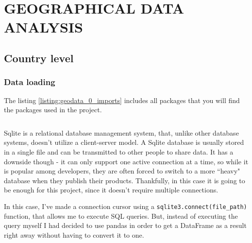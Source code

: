 \documentclass[12pt, a4paper]{article}
\begin{document}
\newpage
\section{GEOGRAPHICAL DATA ANALYSIS}

\subsection{Country level}
\subsubsection{Data loading}


The listing \ref{listing:geodata_0_imports} includes all packages that you will find the packages used in the project.

\bgroup
  \inputminted[linenos, breaklines=true, fontsize=\scriptsize]{python}{src/geo/map/0_imports.py}
  \label{listing:geodata_0_imports}
\egroup


Sqlite \cite{owens2010sqlite} is a relational database management system, that, unlike other database systems, doesn't utilize a client-server model. A Sqlite database is usually stored in a single file and can be transmitted to other people to share data. It has a downside though - it can only support one active connection at a time, so while it is popular among developers, they are often forced to switch to a more ``heavy" database when they publish their products. Thankfully, in this case it is going to be enough for this project, since it doesn't require multiple connections.

In this case, I've made a connection cursor using a \texttt{sqlite3.connect(file\_path)} function, that allows me to execute SQL queries. But, instead of executing the query myself I had decided to use pandas in order to get a DataFrame as a result right away without having to convert it to one.

\bgroup
  \inputminted[linenos, breaklines=true, fontsize=\scriptsize, firstnumber=last]{python}{src/geo/map/1_data_loading.py}
  \label{listing:geodata_1_data_loading}
\egroup
\end{document}
